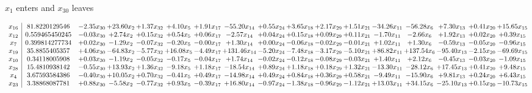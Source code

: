 \documentclass[9pt]{article}
\begin{document}
 $ x_{1} $ enters and $ x_{30} $ leaves 

 \[\begin{array}{c| c c@{\hskip 2pt} c@{\hskip 2pt} c@{\hskip 2pt} c@{\hskip 2pt} c@{\hskip 2pt} c@{\hskip 2pt} c@{\hskip 2pt} c@{\hskip 2pt} c@{\hskip 2pt} c@{\hskip 2pt} c@{\hskip 2pt} c@{\hskip 2pt} c@{\hskip 2pt} c@{\hskip 2pt} c@{\hskip 2pt} }
 x_{16}   &  81.8220129546 & -2.35 x_{30} & + 23.60 x_{2} & +  1.37 x_{32} & +  4.10 x_{5} & +  1.91 x_{17} & -55.20 x_{14} & +  0.55 x_{24} & +  3.65 x_{18} & +  2.17 x_{29} & +  1.51 x_{21} & -34.26 x_{11} & -56.28 x_{6} & +  7.30 x_{13} & +  0.41 x_{20} & + 15.65 x_{15}\\
 x_{12}   &  0.559465450245 & -0.03 x_{30} & +  2.74 x_{2} & +  0.15 x_{32} & +  0.54 x_{5} & +  0.06 x_{17} & -2.57 x_{14} & +  0.04 x_{24} & +  0.15 x_{18} & +  0.09 x_{29} & +  0.11 x_{21} & -1.70 x_{11} & -2.66 x_{6} & +  1.92 x_{13} & +  0.02 x_{20} & +  0.39 x_{15}\\
 x_{7}   &  0.399814277734 & +  0.02 x_{30} & -1.29 x_{2} & -0.07 x_{32} & -0.20 x_{5} & -0.00 x_{17} & +  1.30 x_{14} & +  0.00 x_{24} & -0.06 x_{18} & -0.02 x_{29} & -0.01 x_{21} & +  1.02 x_{11} & +  1.30 x_{6} & -0.59 x_{13} & -0.05 x_{20} & -0.96 x_{15}\\
 x_{19}   &  35.8855405357 & +  4.06 x_{30} & -64.83 x_{2} & -5.77 x_{32} & + 16.08 x_{5} & -4.49 x_{17} & + 131.46 x_{14} & -5.20 x_{24} & -7.48 x_{18} & -3.17 x_{29} & -5.10 x_{21} & + 86.82 x_{11} & + 137.54 x_{6} & -95.40 x_{13} & -2.15 x_{20} & -69.69 x_{15}\\
 x_{10}   &  0.34118005908 & +  0.03 x_{30} & -1.19 x_{2} & -0.05 x_{32} & -0.17 x_{5} & -0.04 x_{17} & +  1.74 x_{14} & -0.02 x_{24} & -0.12 x_{18} & -0.08 x_{29} & -0.03 x_{21} & +  1.40 x_{11} & +  2.12 x_{6} & -0.45 x_{13} & -0.03 x_{20} & -1.09 x_{15}\\
 x_{28}   &  15.4810938142 & -0.55 x_{30} & + 13.93 x_{2} & +  1.36 x_{32} & -9.18 x_{5} & +  1.18 x_{17} & -18.54 x_{14} & +  0.89 x_{24} & +  1.18 x_{18} & +  0.18 x_{29} & +  1.32 x_{21} & -13.30 x_{11} & -28.12 x_{6} & + 17.45 x_{13} & +  0.41 x_{20} & +  9.48 x_{15}\\
 x_{4}   &  3.67593584386 & -0.40 x_{30} & + 10.05 x_{2} & +  0.70 x_{32} & -0.41 x_{5} & +  0.49 x_{17} & -14.98 x_{14} & +  0.49 x_{24} & +  0.84 x_{18} & +  0.36 x_{29} & +  0.58 x_{21} & -9.49 x_{11} & -15.90 x_{6} & +  9.81 x_{13} & +  0.24 x_{20} & +  6.43 x_{15}\\
 x_{23}   &  3.38868087781 & +  0.88 x_{30} & -5.58 x_{2} & -0.77 x_{32} & +  0.93 x_{5} & -0.39 x_{17} & + 16.80 x_{14} & -0.97 x_{24} & -1.38 x_{18} & -0.96 x_{29} & -1.12 x_{21} & + 13.03 x_{11} & + 34.15 x_{6} & -25.10 x_{13} & +  0.15 x_{20} & -10.73 x_{15}\\

\end{array}\]
\end{document}
